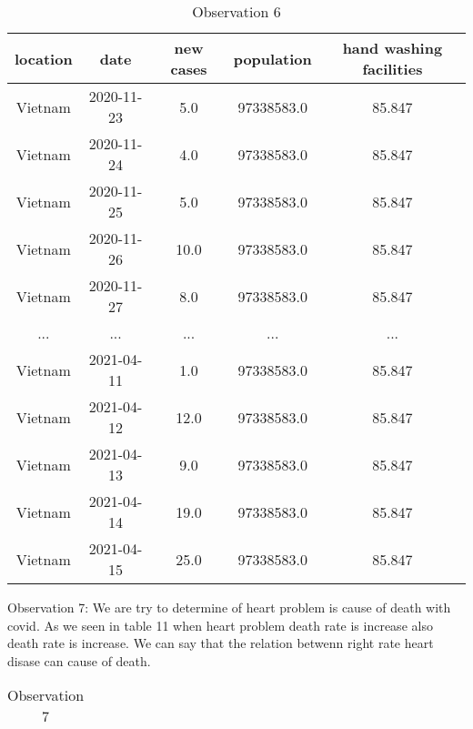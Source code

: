 \documentclass[a4 paper]{article}
\newcommand{\0}{\mathbf{0}}
\begin{document}
\begin{itemize}
    
    \begin{table}[!ht]
    \centering
    \caption{Observation 6}
    \label{tab:Ob62}
    \begin{tabular}{|c|c|c|c|c|}
    \hline
        location    &    date & new cases & population & hand washing facilities\\\hline
        Vietnam & 2020-11-23 & 5.0 & 97338583.0 & 85.847\\\hline
        Vietnam & 2020-11-24 & 4.0 & 97338583.0 & 85.847\\\hline
        Vietnam & 2020-11-25 & 5.0 & 97338583.0 & 85.847\\\hline
        Vietnam & 2020-11-26 & 10.0 & 97338583.0 & 85.847\\\hline
        Vietnam & 2020-11-27 & 8.0 & 97338583.0 & 85.847\\\hline
        ... &  ... & ... & ... & ...\\\hline
        Vietnam & 2021-04-11 & 1.0 & 97338583.0 & 85.847\\\hline
        Vietnam & 2021-04-12 & 12.0 & 97338583.0 & 85.847\\\hline
        Vietnam & 2021-04-13 & 9.0 & 97338583.0 & 85.847\\\hline
        Vietnam & 2021-04-14 & 19.0 & 97338583.0 & 85.847\\\hline
        Vietnam & 2021-04-15 & 25.0 & 97338583.0 & 85.847\\\hline
   \end{tabular}
    \end{table}
    \newpage
    Observation 7:\newline
    We are try to determine of heart problem is cause of death with covid.\newline
    As we seen in table 11 when heart problem death rate is increase also death rate is increase.\newline
    We can say that the relation betwenn right rate heart disase can cause of death.\newline 
    
    \begin{table}[!ht]
    \centering
    \caption{Observation 7}
    \label{tab:Ob7}
    \begin{tabular}{|c|c|c|}
    \hline
    

\end{tabular}
\end{table}
\end{itemize}
\end{document}
